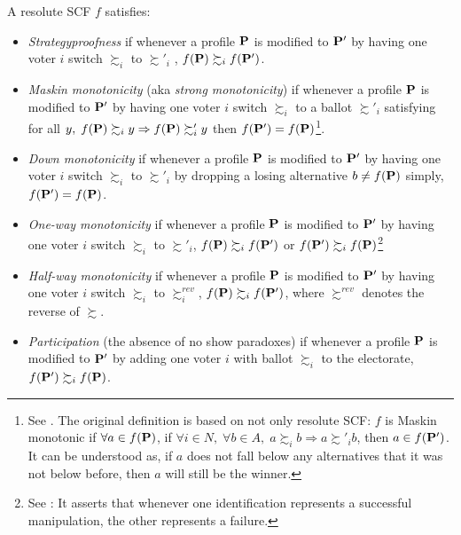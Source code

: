 \begin{definition}
    A resolute SCF $f$ satisfies:
    \begin{itemize}
        \item \textit{Strategyproofness} if whenever a profile $\mathbf{P}$ is modified to $\mathbf{P}'$ by having one voter $i$ switch $\succsim_i$ to $\succsim'_i$ , $f(\mathbf{P}) \succsim_i f(\mathbf{P}')$.
        \item \textit{Maskin monotonicity} (aka \textit{strong monotonicity}) if whenever a profile $\mathbf{P}$ is modified to $\mathbf{P}'$ by having one voter $i$ switch $\succsim_i$ to a ballot $\succsim'_i$ satisfying for all $y,\; f(\mathbf{P}) \succsim_i y \Rightarrow f(\mathbf{P}) \succsim'_i y$ then $f(\mathbf{P}') = f(\mathbf{P})$\footnote{See \textcite{Maskin1999}. The original definition is based on not only resolute SCF: $f$ is Maskin monotonic if $\forall a \in f(\mathbf{P})$, if $\forall i \in N,\; \forall b \in A,\; a \succsim_i b \Rightarrow a \succsim'_i b$, then $a \in f(\mathbf{P}')$. It can be understood as, if $a$ does not fall below any alternatives that it was not below before, then $a$ will still be the winner.}.
        \item \textit{Down monotonicity} if whenever a profile $\mathbf{P}$ is modified to $\mathbf{P}'$ by having one voter $i$ switch $\succsim_i$ to $\succsim'_i$ by dropping a losing alternative $b \neq f(\mathbf{P})$ simply, $f(\mathbf{P}') = f(\mathbf{P})$.
        \item \textit{One-way monotonicity} if whenever a profile $\mathbf{P}$ is modified to $\mathbf{P}'$ by having one voter $i$ switch $\succsim_i$ to $\succsim'_i$, $f(\mathbf{P}) \succsim_i f(\mathbf{P}')$ or $f(\mathbf{P}') \succsim_i f(\mathbf{P})$\footnote{See \textcite{sanverOnewayMonotonicityForm2009}: It asserts that whenever one identification represents a successful manipulation, the other represents a failure.}
        \item \textit{Half-way monotonicity} if whenever a profile $\mathbf{P}$ is modified to $\mathbf{P}'$ by having one voter $i$ switch $\succsim_i$ to $\succsim^{rev}_i$, $f(\mathbf{P}) \succsim_i f(\mathbf{P}')$, where $\succsim^{rev}$ denotes the reverse of $\succsim$.
        \item \textit{Participation} (the absence of no show paradoxes) if whenever a profile $\mathbf{P}$ is modified to $\mathbf{P}'$ by adding one voter $i$ with ballot $\succsim_i$ to the electorate, $f(\mathbf{P}') \succsim_i f(\mathbf{P})$.
    \end{itemize}
\end{definition}

